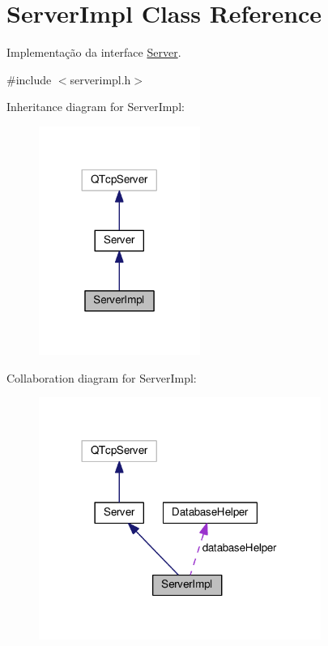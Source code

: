 \hypertarget{classServerImpl}{}\section{Server\+Impl Class Reference}
\label{classServerImpl}


Implementação da interface \hyperlink{classServer}{Server}.  




{\ttfamily \#include $<$serverimpl.\+h$>$}



Inheritance diagram for Server\+Impl\+:\nopagebreak
\begin{figure}[H]
\begin{center}
\leavevmode
\includegraphics[width=149pt]{d3/da0/classServerImpl__inherit__graph}
\end{center}
\end{figure}


Collaboration diagram for Server\+Impl\+:\nopagebreak
\begin{figure}[H]
\begin{center}
\leavevmode
\includegraphics[width=261pt]{de/d15/classServerImpl__coll__graph}
\end{center}
\end{figure}
